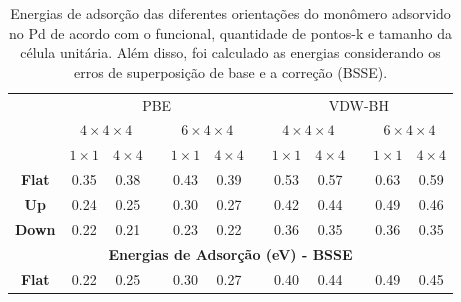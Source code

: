  \begin{table}[b!]
 	\centering
 	 \caption{Energias de adsorção das diferentes orientações do monômero adsorvido no Pd de acordo com o funcional, quantidade de pontos-k e tamanho da célula unitária. Além disso, foi calculado as energias considerando os erros de superposição de base e a correção (BSSE).\label{tab:energies-k}}
 	\begin{tabular}{cccccccccccc} 
 		\hline\hline\addlinespace[3.8pt]
 		\multicolumn{12}{c}{\textbf{Energias de Adsorção (eV)}}                                                                                                                                          \\ 
 		\midrule
 		\multirow{3}{*}{} & \multicolumn{5}{c}{PBE}                                                          &  & \multicolumn{5}{c}{VDW-BH}                                                           \\ 
 		\cmidrule{2-6}\cmidrule{8-12} \textit{Slab}
 		& \multicolumn{2}{c}{$4\times4\times4$} &  & \multicolumn{2}{c}{$6\times4\times4$} &  & \multicolumn{2}{c}{$4\times4\times4$} &  & \multicolumn{2}{c}{$6\times4\times4$}  \\ 
 		\cmidrule{2-3}\cmidrule{5-6}\cmidrule{8-9}\cmidrule{11-12} \textit{Pontos k}
 		& $1\times1$ & $4\times4$             &  & $1\times1$ & $4\times4$                 &  & $1\times1$ &$4\times4$           &  & $1\times1$ & $4\times4$                  \\ 
 		\midrule
 		\textbf{Flat}              & 0.35      & 0.38                         &  & 0.43      & 0.39                         &  & 0.53     & 0.57                         &  & 0.63      & 0.59                          \\ 
 		
 		\textbf{Up}                & 0.24      & 0.25                     &  & 0.30      & 0.27                     &  & 0.42     & 0.44                    &  & 0.49      & 0.46                      \\ 
 		
 		\textbf{Down}              & 0.22      & 0.21                     &  & 0.23      & 0.22                     &  & 0.36     & 0.35                     &  & 0.36      & 0.35                      \\ 
 		\midrule \multicolumn{12}{c}{\textbf{Energias de Adsorção (eV) - BSSE}}                                                                                                                                          \\ \midrule
 		\textbf{Flat}              & 0.22     &          0.25                &  & 0.30      & 0.27                         &  &   0.40  &    0.44                     &  &   0.49    & 0.45                          \\ 
 		

\end{tabular}
\end{table}
